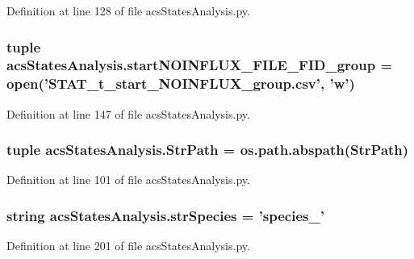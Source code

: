 Definition at line 128 of file acs\-States\-Analysis.\-py.

\hypertarget{a00104_a14eebfeaac72a017ee76d69b55033042}{
\subsubsection[{start\-N\-O\-I\-N\-F\-L\-U\-X\-\_\-\-F\-I\-L\-E\-\_\-\-F\-I\-D\-\_\-group}]{\setlength{\rightskip}{0pt plus 5cm}tuple acs\-States\-Analysis.\-start\-N\-O\-I\-N\-F\-L\-U\-X\-\_\-\-F\-I\-L\-E\-\_\-\-F\-I\-D\-\_\-group = open('S\-T\-A\-T\-\_\-t\-\_\-start\-\_\-\-N\-O\-I\-N\-F\-L\-U\-X\-\_\-group.\-csv', 'w')}}\label{a00104_a14eebfeaac72a017ee76d69b55033042}


Definition at line 147 of file acs\-States\-Analysis.\-py.

\hypertarget{a00104_ac34f3f43f888eb6620266d78ce928ceb}{
\subsubsection[{Str\-Path}]{\setlength{\rightskip}{0pt plus 5cm}tuple acs\-States\-Analysis.\-Str\-Path = os.\-path.\-abspath(Str\-Path)}}\label{a00104_ac34f3f43f888eb6620266d78ce928ceb}


Definition at line 101 of file acs\-States\-Analysis.\-py.

\hypertarget{a00104_ab14d209fe558e83aeede3b657a7241bb}{
\subsubsection[{str\-Species}]{\setlength{\rightskip}{0pt plus 5cm}string acs\-States\-Analysis.\-str\-Species = 'species\-\_\-'}}\label{a00104_ab14d209fe558e83aeede3b657a7241bb}


Definition at line 201 of file acs\-States\-Analysis.\-py.

